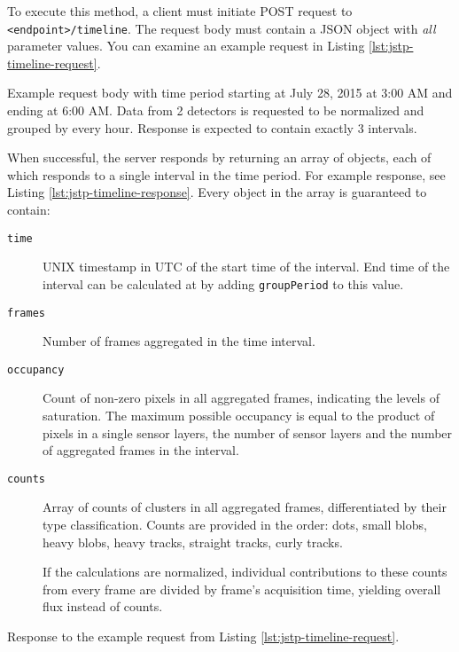 To execute this method, a client must initiate POST request to \texttt{<endpoint>/timeline}. The request body must contain a JSON object with \textit{all} parameter values. You can examine an example request in Listing \ref{lst:jstp-timeline-request}.

\begin{listing}
    \caption{Example request body with time period starting at July 28, 2015 at 3:00 AM and ending at 6:00 AM. Data from 2 detectors is requested to be normalized and grouped by every hour. Response is expected to contain exactly 3 intervals.}
    \label{lst:jstp-timeline-request}
\end{listing}

When successful, the server responds by returning an array of objects, each of which responds to a single interval in the time period. For example response, see Listing \ref{lst:jstp-timeline-response}. Every object in the array is guaranteed to contain:

\begin{description}
	\item[\texttt{time}]
	UNIX timestamp in UTC of the start time of the interval. End time of the interval can be calculated at by adding \texttt{groupPeriod} to this value.

	\item[\texttt{frames}]
	Number of frames aggregated in the time interval.
	
	\item[\texttt{occupancy}]
	Count of non-zero pixels in all aggregated frames, indicating the levels of saturation. The maximum possible occupancy is equal to the product of pixels in a single sensor layers, the number of sensor layers and the number of aggregated frames in the interval.
	
	\item[\texttt{counts}]
	Array of counts of clusters in all aggregated frames, differentiated by their type classification. Counts are provided in the order: dots, small blobs, heavy blobs, heavy tracks, straight tracks, curly tracks.

	If the calculations are normalized, individual contributions to these counts from every frame are divided by frame's acquisition time, yielding overall flux instead of counts.
\end{description}

\begin{listing}
    \caption{Response to the example request from Listing \ref{lst:jstp-timeline-request}.}
    \label{lst:jstp-timeline-response}
\end{listing}


